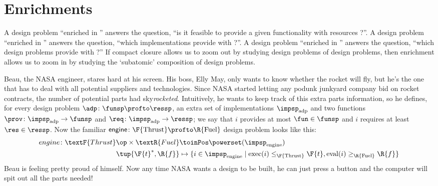 

\section{Enrichments}
\label{sec:enriched}


A design problem ``enriched in \Bool'' answers the question, ``is it feasible to provide a given functionality \fun with resources \res?''. A design problem ``enriched in \Set'' answers the question, ``which implementations provide \fun with \res?''. A design problem ``enriched in \DP'' answers the question, ``which design problems provide \fun with \res?'' If compact closure allows us to zoom out by studying design problems of design problems, then enrichment allows us to zoom in by studying the `subatomic' composition of design problems.

\begin{example}
  \label{ex:dpi_example}
  Beau, the NASA engineer, stares hard at his screen. His boss, Elly May, only wants to know whether the rocket will fly, but he's the one that has to deal with all potential suppliers and technologies. Since NASA started letting any podunk junkyard company bid on rocket contracts, the number of potential parts had sky\emph{rocketed}. Intuitively, he wants to keep track of this extra parts information, so he defines, for every design problem $\adp \colon \funsp \profto \ressp$, an extra set of implementations $\impsp_\text{adp}$ and two functions $\prov\colon \impsp_\text{adp} \to \funsp$ and  $\req\colon \impsp_\text{adp} \to \ressp$; we say that $i$ provides at most $\fun \in \funsp$ and $i$ requires at least $\res \in \ressp$. Now the familiar $\mathsf{engine} \colon \F{\text{Thrust}} \profto \R{\text{Fuel}}$ design problem looks like this:
  \begin{equation*}
    \begin{aligned}
      engine \colon \textF{Thrust}\op \times \textR{Fuel} &\toinPos \powerset(\impsp_\text{engine}) \\
      \tup{\F{t}^*,\R{f}} &\mapsto \{ i \in \impsp_\text{engine} \mid \text{exec}(i) \leq_\F{\text{Thrust}} \F{t}, \text{eval}(i) \geq_\R{\text{Fuel}} \R{f} \}
    \end{aligned}
  \end{equation*}
  Beau is feeling pretty proud of himself. Now any time NASA wants a design to be built, he can just press a button and the computer will spit out all the parts needed!
\end{example}


